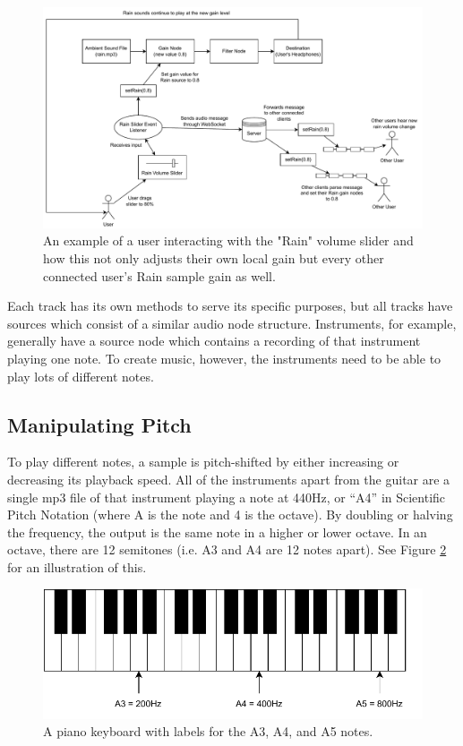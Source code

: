 \begin{figure}[htb]
    \centering
    \includegraphics[width=0.8\linewidth]{images/implementation/socket.pdf}    
    \caption{An example of a user interacting with the "Rain" volume slider and how this not only adjusts their own local gain but every other connected user's Rain sample gain as well.}
    \label{fig:socket}
\end{figure}

Each track has its own methods to serve its specific purposes, but all tracks have sources which consist of a similar audio node structure. Instruments, for example, generally have a source node which contains a recording of that instrument playing one note. To create music, however, the instruments need to be able to play lots of different notes.

\subsection{Manipulating Pitch}
To play different notes, a sample is pitch-shifted by either increasing or decreasing its playback speed. All of the instruments apart from the guitar are a single mp3 file of that instrument playing a note at 440Hz, or “A4” in Scientific Pitch Notation (where A is the note and 4 is the octave). By doubling or halving the frequency, the output is the same note in a higher or lower octave. In an octave, there are 12 semitones (i.e. A3 and A4 are 12 notes apart). See Figure \ref{fig:keyboard} for an illustration of this.

\begin{figure}[htb]
    \centering
    \includegraphics[width=0.7\linewidth]{images/implementation/keyboard.pdf}    
    \caption{A piano keyboard with labels for the A3, A4, and A5 notes.}
    \label{fig:keyboard}
\end{figure}

